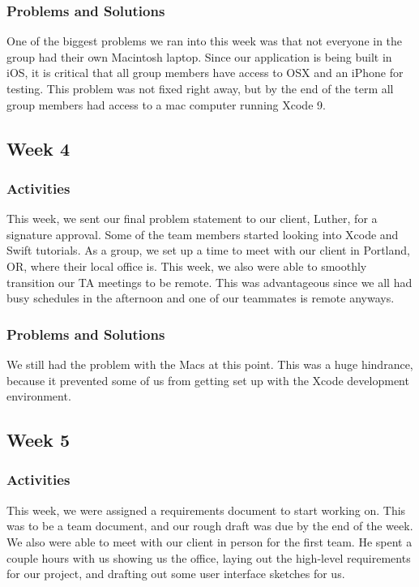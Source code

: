 \documentclass[onecolumn, draftclsnofoot,10pt, compsoc]{IEEEtran}
\begin{document}
\subsubsection{Problems and Solutions}
One of the biggest problems we ran into this week was that not everyone in the group had their own Macintosh laptop. Since our application is being built in iOS, it is critical that all group members have access to OSX and an iPhone for testing. This problem was not fixed right away, but by the end of the term all group members had access to a mac computer running Xcode 9.

\subsection{Week 4}
\subsubsection{Activities}
This week, we sent our final problem statement to our client, Luther, for a signature approval. Some of the team members started looking into Xcode and Swift tutorials. As a group, we set up a time to meet with our client in Portland, OR, where their local office is. This week, we also were able to smoothly transition our TA meetings to be remote. This was advantageous since we all had busy schedules in the afternoon and one of our teammates is remote anyways.
\subsubsection{Problems and Solutions}
We still had the problem with the Macs at this point. This was a huge hindrance, because it prevented some of us from getting set up with the Xcode development environment. 

\subsection{Week 5}
\subsubsection{Activities}
This week, we were assigned a requirements document to start working on. This was to be a team document, and our rough draft was due by the end of the week. We also were able to meet with our client in person for the first team. He spent a couple hours with us showing us the office, laying out the high-level requirements for our project, and drafting out some user interface sketches for us.
\end{document}
